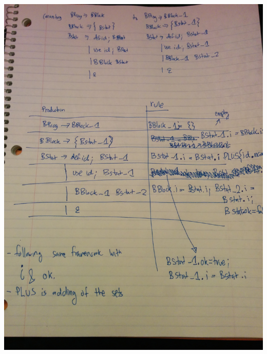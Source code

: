 \documentclass[11pt, oneside]{article}   	%
\begin{document}
\includegraphics[scale=0.15]{IMG_20141008_222706.jpg}
\end{document}
